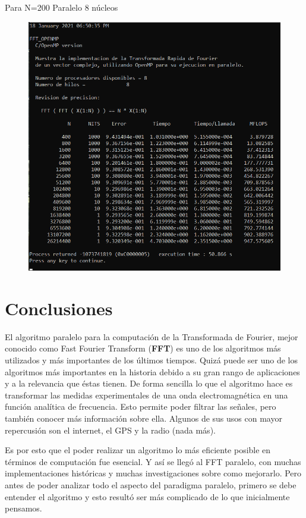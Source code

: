 \documentclass{report}
\begin{document}
\clearpage

Para N=200 Paralelo 8 núcleos\medskip

\begin{figure}[h!]
    \centering
    \includegraphics[scale=.8]{Images/FFT_Par_200_8n.png}
    \label{Paralelo 1.6}
\end{figure}

\clearpage
\section*{Conclusiones}
\noindent El algoritmo paralelo para la computación de la Transformada de Fourier, mejor conocido como Fast Fourier Transform (\textbf{FFT}) es uno de los algoritmos más utilizados y más importantes de los últimos tiempos. Quizá puede ser uno de los algoritmos más importantes en la historia debido a su gran rango de aplicaciones y a la relevancia que éstas tienen. De forma sencilla lo que el algoritmo hace es transformar las medidas experimentales de una onda electromagnética en una función analítica de frecuencia. Esto permite poder filtrar las señales, pero también conocer más información sobre ella. Algunos de sus usos con mayor repercusión son el internet, el GPS y la radio (nada más).\medskip

Es por esto que el poder realizar un algoritmo lo más eficiente posible en términos de computación fue esencial. Y así se llegó al FFT paralelo, con muchas implementaciones históricas y muchas investigaciones sobre como mejorarlo. Pero antes de poder analizar todo el aspecto del paradigma paralelo, primero se debe entender el algoritmo y esto resultó ser más complicado de lo que inicialmente pensamos.\medskip
\end{document}

